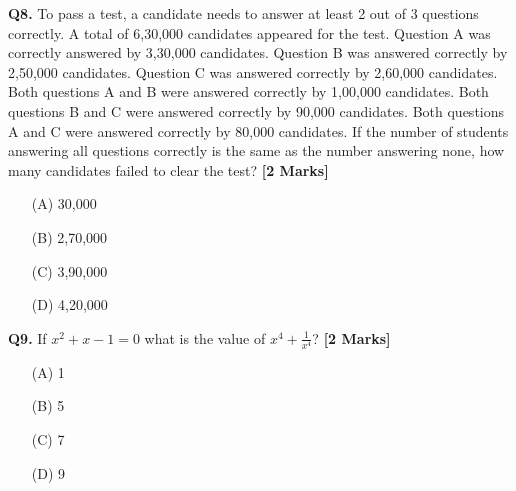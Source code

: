 \documentclass[11pt]{article}
\newcommand{\questionb}[2]{
    \noindent\textbf{Q#2.} #1 \hfill \textbf{[2 Marks]}
}
\begin{document}
\questionb{To pass a test, a candidate needs to answer at least 2 out of 3 questions correctly. A total of 6,30,000 candidates appeared for the test. Question A was correctly answered by 3,30,000 candidates. Question B was answered correctly by 2,50,000 candidates. Question C was answered correctly by 2,60,000 candidates. Both questions A and B were answered correctly by 1,00,000 candidates. Both questions B and C were answered correctly by 90,000 candidates. Both questions A and C were answered correctly by 80,000 candidates. If the number of students answering all questions correctly is the same as the number answering none, how many candidates failed to clear the test?}{8}
\begin{enumerate}
    \item[(A)] 30,000  
    \item[(B)] 2,70,000  
    \item[(C)] 3,90,000  
    \item[(D)] 4,20,000  
\end{enumerate}

\questionb{If \(x^2 + x - 1 = 0\) what is the value of \(x^4 + \frac{1}{x^4}\)?}{9}
\begin{enumerate}
    \item[(A)] 1  
    \item[(B)] 5  
    \item[(C)] 7  
    \item[(D)] 9  
\end{enumerate}
\end{document}
